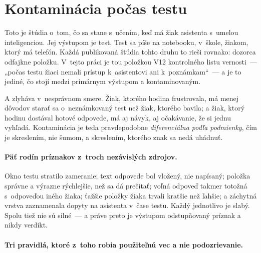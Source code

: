 \section{Kontaminácia počas testu}
\label{sec:kontaminacia}

Toto je štúdia o~tom, čo sa stane s~učením, keď má žiak asistenta s~umelou
inteligenciou. Jej výstupom je test. Test sa píše na notebooku, v~škole, žiakom,
ktorý má telefón. Každá publikovaná štúdia tohto druhu to rieši rovnako: dozorca
odfajkne položku. V~tejto práci je tou položkou V12 kontrolného listu vernosti~---
„počas testu žiaci nemali prístup k~asistentovi ani k~poznámkam“~--- a je to
jediné, čo stojí medzi primárnym výstupom a kontaminovaným.

A zlyháva v~nesprávnom smere. Žiak, ktorého hodina frustrovala, má menej dôvodov
starať sa o~neznámkovaný test než žiak, ktorého bavila; a žiak, ktorý hodinu
dostával hotové odpovede, má aj návyk, aj očakávanie, že si jednu vyhľadá.
Kontaminácia je teda pravdepodobne \emph{diferenciálna podľa podmienky}, čím je
skreslením, nie šumom, a skreslením, ktorého znak sa nedá uhádnuť.

\paragraph{Päť rodín príznakov z~troch nezávislých zdrojov.} Okno testu stratilo
zameranie; text odpovede bol vložený, nie napísaný; položka správne a výrazne
rýchlejšie, než sa dá prečítať; voľná odpoveď takmer totožná s~odpoveďou iného
žiaka; ťažšie položky žiaka trvali kratšie než ľahšie; a záchytná vrstva
zaznamenala dopyty na asistenta v~čase testu. Každý jednotlivo je slabý. Spolu
tiež nie sú silné~--- a práve preto je výstupom odstupňovaný príznak a nikdy
verdikt.

\paragraph{Tri pravidlá, ktoré z~toho robia použiteľnú vec a nie podozrievanie.}

